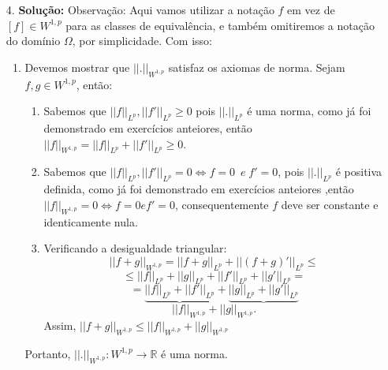 \documentclass{article}
\begin{document}
\begin{enumerate}
		\item[4.] \textbf{Solução:} Observação: Aqui vamos utilizar a notação $f$ em vez de $[f] \in W^{1,p}$ para as classes de equivalência, e também omitiremos a notação do domínio $\Omega$, por simplicidade. Com isso:
			\begin{enumerate}
				\item Devemos mostrar que $||.||_{W^{1,p}}$ satisfaz os axiomas de norma. Sejam $f, g \in W^{1,p}$, então:
				\begin{enumerate}
					\item Sabemos que  $||f||_{L^{p}}, ||f'||_{L^{p}} \geq 0$ pois $||.||_{L^{p}}$ é uma norma, como já foi demonstrado em exercícios anteiores, então $||f||_{W^{1,p}} = ||f||_{L^{p}} + ||f'||_{L^{p}} \geq 0$.
					
					\item Sabemos que $||f||_{L^{p}}, ||f'||_{L^{p}} = 0 \iff f=0 \;\ e \; f'=0$, pois $||.||_{L^{p}}$ é positiva definida, como já foi demonstrado em exercícios anteiores ,então $||f||_{W^{1,p}} = 0 \iff f = 0 e f' =0$, consequentemente $f$ deve ser constante e identicamente nula.
					
					\item Verificando a desigualdade triangular: 
					$$
					||f + g||_{W^{1,p}} =  ||f+g||_{L^{p}} + ||(f + g)'||_{L^{p}} \leq
					$$
					$$ \leq ||f||_{L^{p}}+||g||_{L^{p}}+||f'||_{L^{p}}+||g'||_{L^{p}} =  
					$$
					$$
					=\underbrace{||f||_{L^{p}}+||f'||_{L^{p}}} + \underbrace{||g||_{L^{p}}+||g'||_{L^{p}}}
					$$
					$$
					||f ||_{W^{1,p}}+|| g||_{W^{1,p}}.
					$$ 
					Assim, $||f + g||_{W^{1,p}} \leq ||f ||_{W^{1,p}}+|| g||_{W^{1,p}}$
					
				\end{enumerate}
				Portanto, $||. ||_{W^{1,p}}: W^{1,p} \to \mathbb{R}$ é uma norma.
				

\end{enumerate}
\end{enumerate}
\end{document}
